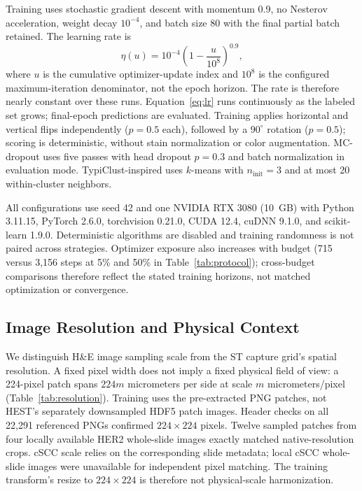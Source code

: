 \documentclass[]{spie}
\begin{document}
Training uses stochastic gradient descent with momentum 0.9, no Nesterov acceleration, weight decay $10^{-4}$, and batch size 80 with the final partial batch retained. The learning rate is
\begin{equation}
\eta(u)=10^{-4}\left(1-\frac{u}{10^{8}}\right)^{0.9},
\label{eq:lr}
\end{equation}
where $u$ is the cumulative optimizer-update index and $10^{8}$ is the configured maximum-iteration denominator, not the epoch horizon. The rate is therefore nearly constant over these runs. Equation~\ref{eq:lr} runs continuously as the labeled set grows; final-epoch predictions are evaluated. Training applies horizontal and vertical flips independently ($p=0.5$ each), followed by a $90^{\circ}$ rotation ($p=0.5$); scoring is deterministic, without stain normalization or color augmentation. MC-dropout uses five passes with head dropout $p=0.3$ and batch normalization in evaluation mode. TypiClust-inspired uses $k$-means with $n_{\mathrm{init}}=3$ and at most 20 within-cluster neighbors.

All configurations use seed 42 and one NVIDIA RTX 3080 (10~GB) with Python 3.11.15, PyTorch 2.6.0, torchvision 0.21.0, CUDA 12.4, cuDNN 9.1.0, and scikit-learn 1.9.0. Deterministic algorithms are disabled and training randomness is not paired across strategies. Optimizer exposure also increases with budget (715 versus 3,156 steps at 5\% and 50\% in Table~\ref{tab:protocol}); cross-budget comparisons therefore reflect the stated training horizons, not matched optimization or convergence.

\subsection{Image Resolution and Physical Context}
\label{sec:resolution}

We distinguish H\&E image sampling scale from the ST capture grid's spatial resolution. A fixed pixel width does not imply a fixed physical field of view: a 224-pixel patch spans $224m$ micrometers per side at scale $m$ micrometers/pixel (Table~\ref{tab:resolution}). Training uses the pre-extracted PNG patches, not HEST's separately downsampled HDF5 patch images. Header checks on all 22,291 referenced PNGs confirmed $224\times224$ pixels. Twelve sampled patches from four locally available HER2 whole-slide images exactly matched native-resolution crops. cSCC scale relies on the corresponding slide metadata; local cSCC whole-slide images were unavailable for independent pixel matching. The training transform's resize to $224\times224$ is therefore not physical-scale harmonization.
\end{document}
